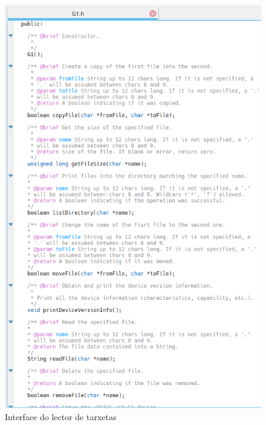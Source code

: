    \begin{figure}[htbp]
    \centering
    \includegraphics[scale=0.8,keepaspectratio=true]{./imagenes/interface-lector-tarxetas.png}
    \caption{Interface do lector de tarxetas}
    \label{figura:InterfaceLectorTarxetas}
   \end{figure}
   
